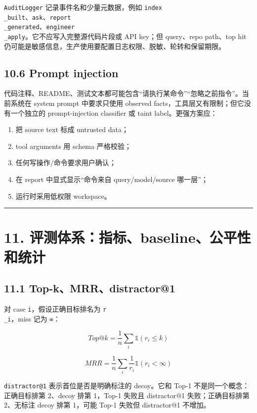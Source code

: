 \documentclass[UTF8,12pt,openany]{ctexbook}
\begin{document}
\texttt{AuditLogger} 记录事件名和少量元数据，例如 \texttt{index\\_built}、\texttt{ask}、\texttt{report\\_generated}、\texttt{engineer\\_apply}。它不应写入完整源代码片段或 API key；但 query、repo path、top hit 仍可能是敏感信息，生产使用要配置日志权限、脱敏、轮转和保留期限。\par

\subsection{10.6 Prompt injection}

代码注释、README、测试文本都可能包含“请执行某命令”“忽略之前指令”。当前系统在 system prompt 中要求只使用 observed facts，工具层又有限制；但它没有一个独立的 prompt-injection classifier 或 taint label。更强方案应：\par

\begin{enumerate}
\item 把 source text 标成 untrusted data；
\item tool arguments 用 schema 严格校验；
\item 任何写操作/命令要求用户确认；
\item 在 report 中显式显示“命令来自 query/model/source 哪一层”；
\item 运行时采用低权限 workspace。
\end{enumerate}

\hrule

\section{11. 评测体系：指标、baseline、公平性和统计}

\subsection{11.1 Top-k、MRR、distractor@1}

对 case \texttt{i}，假设正确目标排名为 \texttt{r\\_i}，miss 记为 \texttt{∞}：\par

\[
Top@k=\frac{1}{n}\sum_i \mathbb{1}(r_i\le k)
\]

\[
MRR=\frac{1}{n}\sum_i \frac{1}{r_i}\mathbb{1}(r_i<\infty)
\]

\texttt{distractor@1} 表示首位是否是明确标注的 decoy。它和 Top-1 不是同一个概念：正确目标排第 2、decoy 排第 1，Top-1 失败且 distractor@1 失败；正确目标排第 2、无标注 decoy 排第 1，可能 Top-1 失败但 distractor@1 不增加。\par
\end{document}
